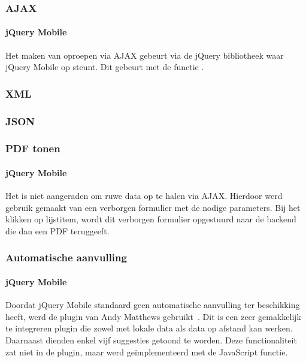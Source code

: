 \subsubsection{AJAX}

\paragraph{jQuery Mobile} 
Het maken van oproepen via AJAX gebeurt via de jQuery bibliotheek waar jQuery Mobile op steunt. Dit gebeurt met de functie . 

\subsubsection{XML}

\subsubsection{JSON}

\subsubsection{PDF tonen}

\paragraph{jQuery Mobile} 
Het is niet aangeraden om ruwe data op te halen via AJAX. Hierdoor werd gebruik gemaakt van een verborgen formulier met de nodige parameters. Bij het klikken op lijstitem, wordt dit verborgen formulier opgestuurd naar de backend die dan een PDF teruggeeft.

\subsubsection{Automatische aanvulling}

\paragraph{jQuery Mobile} 
Doordat jQuery Mobile standaard geen automatische aanvulling ter beschikking heeft, werd de plugin van Andy Matthews gebruikt~\cite{Matthews2013}. Dit is een zeer gemakkelijk te integreren plugin die zowel met lokale data als data op afstand kan werken. Daarnaast dienden enkel vijf suggesties getoond te worden. Deze functionaliteit zat niet in de plugin, maar werd geïmplementeerd met de JavaScript  functie.

